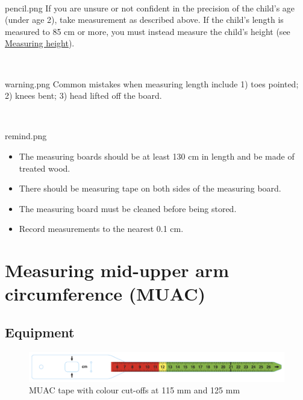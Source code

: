 \documentclass[
  12pt,
]{book}
\newenvironment{rmdremind}
  {\begin{tcolorbox}[width=\textwidth, 
                     colback = {white}, 
                     title = {\textbf{Remember}}, 
                     colbacktitle = lightgray,
                     coltitle = black]
  \begin{includegraphics}[scale = 1]{remind.png}
  \begin{itemize}}
  {\end{itemize}
  \end{includegraphics}
  \end{tcolorbox}}
\newenvironment{rmdnote}
  {\begin{tcolorbox}[width=\textwidth, 
                     colback = {white}, 
                     title = {\textbf{Note}}, 
                     colbacktitle = lightgray,
                     coltitle = black]
  \begin{includegraphics}[scale = 1]{pencil.png}}
  {\end{includegraphics}
  \end{tcolorbox}}
\newenvironment{rmdwarning}
  {\begin{tcolorbox}[width=\textwidth, 
                     colback = {white}, 
                     title = {\textbf{Warning}}, 
                     colbacktitle = lightgray,
                     coltitle = black]
  \begin{includegraphics}[scale = 1]{warning.png}}
  {\end{includegraphics}
  \end{tcolorbox}}
\begin{document}
~

\begin{rmdnote}
If you are unsure or not confident in the precision of the child's age (under age 2), take measurement as described above. If the child's length is measured to 85 cm or more, you must instead measure the child's height (see \protect\hyperlink{measuring-height}{Measuring height}).
\end{rmdnote}

~

\begin{rmdwarning}
Common mistakes when measuring length include 1) toes pointed; 2) knees bent; 3) head lifted off the board.
\end{rmdwarning}

~

\begin{rmdremind}
\item

The measuring boards should be at least 130 cm in length and be made of treated wood.

\item

There should be measuring tape on both sides of the measuring board.

\item

The measuring board must be cleaned before being stored.

\item

Record measurements to the nearest 0.1 cm.
\end{rmdremind}

\hypertarget{muac}{%
\chapter{Measuring mid-upper arm circumference (MUAC)}\label{muac}}

\hypertarget{equipment-2}{%
\section{Equipment}\label{equipment-2}}

\begin{figure}

{\centering \includegraphics[width=13.11in]{images/muac01} 

}

\caption{MUAC tape with colour cut-offs at 115 mm and 125 mm}\label{fig:muac1}
\end{figure}
\end{document}

